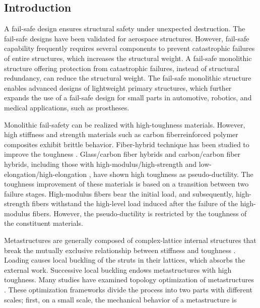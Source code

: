 \documentclass[a4paper,7pt,fleqn]{article}   %
\begin{document}
	
	\begin{multicols}{2} %
		
		\section{Introduction}
		\label{Introduction}
		A fail-safe design ensures structural safety under unexpected
		destruction. The fail-safe designs have been validated for aerospace
		structures. However, fail-safe capability frequently requires several
		components to prevent catastrophic failures of entire structures, which
		increases the structural weight. A fail-safe monolithic structure offering
		protection from catastrophic failures, instead of structural redundancy,
		can reduce the structural weight. The fail-safe monolithic structure enables
		advanced designs of lightweight primary structures, which further
		expands the use of a fail-safe design for small parts in automotive, robotics,
		and medical applications, such as prostheses.\par    %
		Monolithic fail-safety can be realized with high-toughness materials.
		However, high stiffness and strength materials such as carbon fiberreinforced
		polymer composites exhibit brittle behavior. Fiber-hybrid
		technique has been studied to improve the toughness \cite{r01}. Glass/carbon
		fiber hybrids \cite{r02} and carbon/carbon fiber hybrids, including
		those with high-modulus/high-strength \cite{r03} and
		low-elongation/high-elongation \cite{r04}, have shown high toughness as
		pseudo-ductility. The toughness improvement of these materials is based
		on a transition between two failure stages. High-modulus fibers bear the
		initial load, and subsequently, high-strength fibers withstand the
		high-level load induced after the failure of the high-modulus fibers.
		However, the pseudo-ductility is restricted by the toughness of the
		constituent materials.\par     %
		Metastructures are generally composed of complex-lattice internal
		structures that break the mutually exclusive relationship between stiffness
		and toughness \cite{r05,r06}. Loading causes local buckling of the struts in
		their lattices, which absorbs the external work. Successive local buckling
		endows metastructures with high toughness. Many studies have examined
		topology optimization of metastructures \cite{r07,r08,r09,r10,r11,r12,r13}. These optimization
		frameworks divide the process into two parts with different scales;
		first, on a small scale, the mechanical behavior of a metastructure is

\end{multicols}
\end{document}
